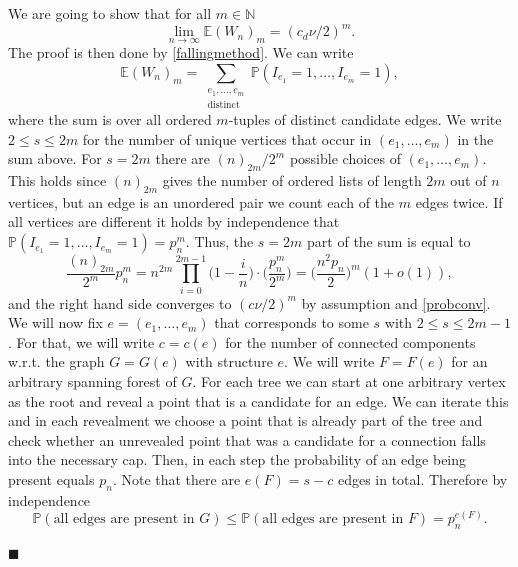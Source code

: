 \documentclass[11pt]{article}%
\newenvironment{proof}{\vspace{1ex}\noindent{\bf Proof.}}{\hspace*{\fill}$\blacksquare$\vspace{1ex}}
\newcommand{\NN}{\mathbb{N}}
\newcommand{\Pro}{\mathbb{P}}
\newcommand{\Ex}{\mathbb{E}}
\begin{document}
\begin{proof}
	We are going to show that for all $ m\in \NN $
	\begin{equation*}
		\lim_{n \to \infty}\Ex (W_n)_m = (c_d\nu/2)^m.
	\end{equation*}
	The proof is then done by \cref{fallingmethod}. We can write
	\begin{equation}\label{factorialsum}
		\Ex (W_n)_m =\sum_{\substack{e_1,\dots,e_m\\ \text{distinct}}}\Pro(I_{e_1}=1,\dots,I_{e_m}=1),
	\end{equation}
	where the sum is over all ordered $ m $-tuples of distinct candidate edges. We write $ 2\leq s\leq 2m $ for the number of unique vertices that occur in $ (e_1,\dots,e_m)  $ in the sum above. For $ s=2m $ there are $ (n)_{2m}/2^m $ possible choices of $ (e_1,\dots,e_m) $. This holds since $ (n)_{2m} $ gives the number of ordered lists of length $ 2m $ out of $ n $ vertices, but an edge is an unordered pair we count each of the $ m $ edges twice. If all vertices are different it holds by independence that $ \Pro(I_{e_1}=1,\dots,I_{e_m}=1)=p_n^m $. Thus, the $ s=2m $ part of the sum is equal to 
	\begin{equation*}
		\frac{(n)_{2m}}{2^m} p_n^m= n^{2m}\prod_{i=0}^{2m-1}\bigg(1-\frac{i}{n}\bigg)\cdot\bigg(\frac{p_n^m}{2^m}\bigg)=\bigg(\frac{n^2p_n}{2}\bigg)^m(1+o(1)),
	\end{equation*}
	and the right hand side converges to $ (c\nu/2)^m $ by assumption and \cref{probconv}. We will now fix $ e=(e_1,\dots,e_m)  $ that corresponds to some $ s $ with $ 2\leq s\leq 2m-1 $. For that, we will write $ c=c(e) $ for the number of connected components w.r.t. the graph $ G=G(e) $ with structure $ e $. We will write $ F=F(e) $ for an arbitrary spanning forest of $ G $. For each tree we can start at one arbitrary vertex as the root and reveal a point that is a candidate for an edge. We can iterate this and in each revealment we choose a point that is already part of the tree and check whether an unrevealed point that was a candidate for a connection falls into the necessary cap. Then, in each step the probability of an edge being present equals $ p_n $. Note that there are $ e(F)=s-c$ edges in total. Therefore by independence 
	\begin{equation*}
		\Pro(\text{all edges are present in }G)\leq \Pro(\text{all edges are present in  }F)=  p_n^{e(F)}.
	\end{equation*}

\end{proof}
\end{document}
